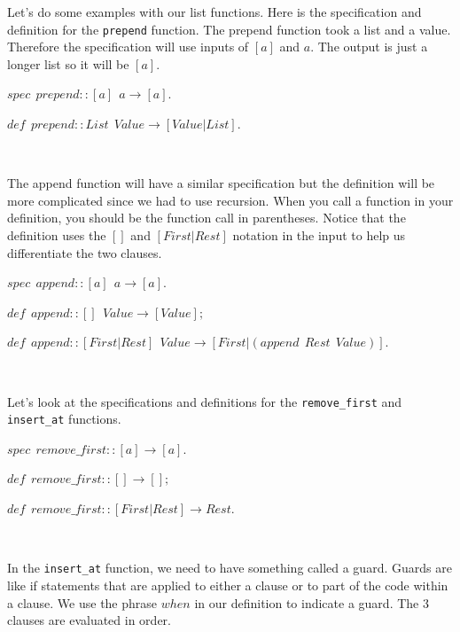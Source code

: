 \documentclass[
]{book}
\begin{document}
Let's do some examples with our list functions. Here is the specification and definition for the \texttt{prepend} function. The prepend function took a list and a value. Therefore the specification will use inputs of \([a]\) and \(a\). The output is just a longer list so it will be \([a]\).

\begin{formulabox}
\(spec ~ ~ prepend :: [a] ~ ~ a \rightarrow [a].\)

\(de\mathit{f} ~ ~ prepend :: List ~ ~ Value \rightarrow [Value|List].\)

\end{formulabox}

\(\nonumber\)

The append function will have a similar specification but the definition will be more complicated since we had to use recursion. When you call a function in your definition, you should be the function call in parentheses. Notice that the definition uses the \([]\) and \([First|Rest]\) notation in the input to help us differentiate the two clauses.

\begin{formulabox}
\(spec ~ ~ append :: [a] ~ ~ a \rightarrow [a].\)

\(de\mathit{f} ~ ~ append :: [] ~ ~ Value \rightarrow [Value];\)

\(de\mathit{f} ~ ~ append :: [First|Rest] ~ ~ Value \rightarrow [First | (append ~ ~ Rest ~ ~ Value)].\)

\end{formulabox}

\(\nonumber\)

Let's look at the specifications and definitions for the \texttt{remove\_first} and \texttt{insert\_at} functions.

\begin{formulabox}
\(spec ~ ~ remove\_first :: [a] \rightarrow [a].\)

\(de\mathit{f} ~ ~ remove\_first :: [] \rightarrow [];\)

\(de\mathit{f} ~ ~ remove\_first::[First|Rest] \rightarrow Rest.\)

\end{formulabox}

\(\nonumber\)

In the \texttt{insert\_at} function, we need to have something called a guard. Guards are like if statements that are applied to either a clause or to part of the code within a clause. We use the phrase \(when\) in our definition to indicate a guard. The 3 clauses are evaluated in order.
\end{document}
